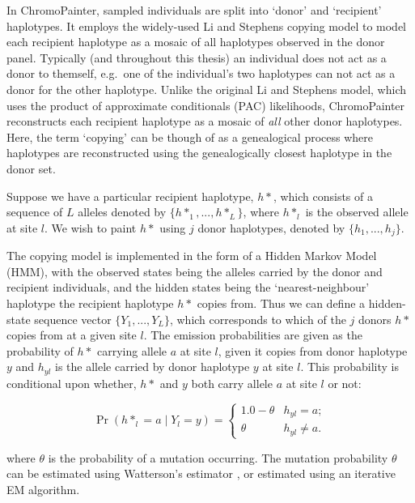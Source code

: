 In ChromoPainter, sampled individuals are split into `donor' and `recipient' haplotypes. It employs the widely-used Li and Stephens copying model \cite{Li2003} to model each recipient haplotype as a mosaic of all haplotypes observed in the donor panel. Typically (and throughout this thesis) an individual does not act as a donor to themself, e.g.\ one of the individual's two haplotypes can not act as a donor for the other haplotype. Unlike the original Li and Stephens model, which uses the product of approximate conditionals (PAC) likelihoods, ChromoPainter reconstructs each recipient haplotype as a mosaic of \textit{all} other donor haplotypes. Here, the term `copying' can be though of as a genealogical process where haplotypes are reconstructed using the genealogically closest haplotype in the donor set.  

Suppose we have a particular recipient haplotype, $h*$, which consists of a sequence of $L$ alleles denoted by $\{h*_{1}, ..., h*_{L}\}$, where $h*_{l}$ is the observed allele at site $l$. We wish to paint $h*$ using $j$ donor haplotypes, denoted by $\{h_{1}, ..., h_{j}\}$. 

The copying model is implemented in the form of a Hidden Markov Model (HMM), with the observed states being the alleles carried by the donor and recipient individuals, and the hidden states being the `nearest-neighbour' haplotype the recipient haplotype $h*$ copies from. Thus we can define a hidden-state sequence vector $\{Y_{1}, ..., Y_{L}\}$, which corresponds to which of the $j$ donors $h*$ copies from at a given site $l$. The emission probabilities are given as the probability of $h*$ carrying allele $a$ at site $l$, given it copies from donor haplotype $y$ and $h_{yl}$ is the allele carried by donor haplotype $y$ at site $l$. This probability is conditional upon whether, $h*$ and $y$ both carry allele $a$ at site $l$ or not:

\begin{equation} \label{eq:cp}
\Pr(h*_{l} = a \mid Y_{l} = y) =     
	\begin{cases}
		1.0 - \theta & h_{yl} = a; \\
		\theta & h_{yl} \neq a. 
	\end{cases}       
\end{equation}

where $\theta$ is the probability of a mutation occurring. The mutation probability $\theta$ can be estimated using Watterson's estimator \cite{Watterson1975}, or estimated using an iterative EM algorithm.

